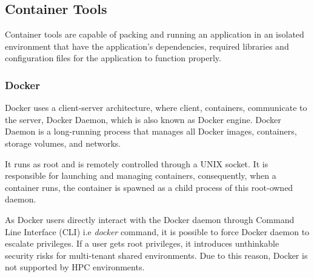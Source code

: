 \documentclass[a4paper,num-refs]{oup-contemporary}
\begin{document}
\subsection{Container Tools}

Container tools are capable of packing and running an application in an isolated environment that have
the application's dependencies,
required libraries and configuration files for the
application to function properly.

\subsubsection{Docker}

Docker uses a client-server architecture, where client, containers, communicate to
the server, Docker Daemon, which is also known as Docker engine.
Docker Daemon is a long-running process that manages all Docker images, containers, storage volumes, and networks.

%
%
%
It runs as root and is remotely controlled through a
UNIX socket. It is responsible for launching and managing containers,
consequently, when a container runs, the container is spawned as a
child process of this root-owned daemon.

As Docker users directly interact with the
Docker daemon through Command Line Interface (CLI) i.e \textit{docker} command, it is possible to force Docker daemon to escalate privileges.
If a user gets root privileges, it
introduces unthinkable security risks for multi-tenant shared
environments. Due to this reason, Docker is not supported by
HPC environments.
\end{document}
